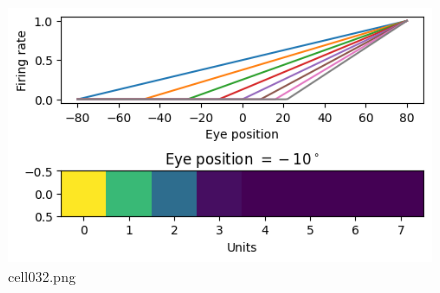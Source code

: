 \begin{figure}[ht]
	\centering
	\includegraphics[scale=0.8, max width=\linewidth]{./fig/solve-credit-assignment-problem/backpropagation/cell032.png}
	\caption{cell032.png}
	\label{cell032.png}
\end{figure}